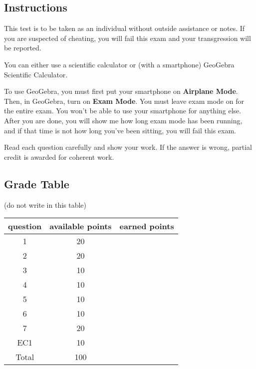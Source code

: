 \documentclass[12pt]{article}
\begin{document}
\subsection*{Instructions}

This test is to be taken as an individual without outside assistance or notes. If you are suspected of cheating, you will fail this exam and your transgression will be reported.

You can either use a scientific calculator or (with a smartphone) GeoGebra Scientific Calculator.

To use GeoGebra, you must first put your smartphone on {\bf Airplane Mode}. Then, in GeoGebra, turn on {\bf Exam Mode}. You must leave exam mode on for the entire exam. You won't be able to use your smartphone for anything else. After you are done, you will show me how long exam mode has been running, and if that time is not how long you've been sitting, you will fail this exam.

Read each question carefully and show your work. If the answer is wrong, partial credit is awarded for coherent work.

\subsection*{Grade Table}

(do not write in this table)

\Large 

\begin{tabular}{|c|c|c|} \hline
question & available points & earned points \\ \hline \hline
1 & 20 & \\ \hline
2 & 20 &  \\ \hline
3 & 10 &  \\ \hline
4 & 10 &  \\ \hline
5 & 10 &  \\ \hline
6 & 10 &  \\ \hline
7 & 20 & \\ \hline
EC1 & 10 &  \\ \hline
Total & 100 & \\ \hline
\end{tabular}

\normalsize

\newpage

\begin{enumerate}
\end{enumerate}
\end{document}
